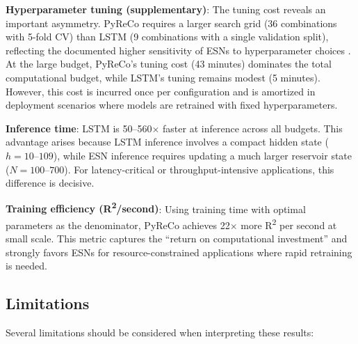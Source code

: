 \textbf{Hyperparameter tuning (supplementary)}: The tuning cost reveals an important asymmetry. PyReCo requires a larger search grid (36 combinations with 5-fold CV) than LSTM (9 combinations with a single validation split), reflecting the documented higher sensitivity of ESNs to hyperparameter choices \cite{matzner2022hyperparameter}. At the large budget, PyReCo's tuning cost (43 minutes) dominates the total computational budget, while LSTM's tuning remains modest (5 minutes). However, this cost is incurred once per configuration and is amortized in deployment scenarios where models are retrained with fixed hyperparameters.

\textbf{Inference time}: LSTM is 50--560$\times$ faster at inference across all budgets. This advantage arises because LSTM inference involves a compact hidden state ($h = 10$--$109$), while ESN inference requires updating a much larger reservoir state ($N = 100$--$700$). For latency-critical or throughput-intensive applications, this difference is decisive.

\textbf{Training efficiency (R\textsuperscript{2}/second)}: Using training time with optimal parameters as the denominator, PyReCo achieves 22$\times$ more R\textsuperscript{2} per second at small scale. This metric captures the ``return on computational investment'' and strongly favors ESNs for resource-constrained applications where rapid retraining is needed.

\subsection{Limitations}
\label{sec:limitations}

Several limitations should be considered when interpreting these results:

